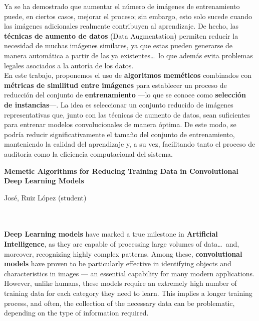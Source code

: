 Ya se ha demostrado que aumentar el número de imágenes de entrenamiento puede, en ciertos casos, mejorar el proceso;
sin embargo, esto solo sucede cuando las imágenes adicionales realmente contribuyen al aprendizaje.
De hecho, las \textbf{técnicas de aumento de datos} (Data Augmentation) permiten reducir la necesidad de muchas
imágenes similares, ya que estas pueden generarse de manera automática a partir de las ya existentes\ldots\ lo que además
evita problemas legales asociados a la autoría de los datos. \\[6pt]

En este trabajo, proponemos el uso de \textbf{algoritmos meméticos} combinados con
\textbf{métricas de similitud entre imágenes} para establecer un proceso de reducción del conjunto de
\textbf{entrenamiento} —lo que se conoce como \textbf{selección de instancias}—.
La idea es seleccionar un conjunto reducido de imágenes representativas que, junto con las técnicas de aumento de
datos, sean suficientes para entrenar modelos convolucionales de manera óptima.
De este modo, se podría reducir significativamente el tamaño del conjunto de entrenamiento, manteniendo la calidad
del aprendizaje y, a su vez, facilitando tanto el proceso de auditoría como la eficiencia computacional del sistema.
\\[6pt]


\cleardoublepage


\thispagestyle{empty}


\begin{center}
       {\large\bfseries Memetic Algorithms for Reducing Training Data in Convolutional Deep Learning Models}\\
\end{center}
\begin{center}
       José, Ruiz López (student)\\
\end{center}

\\

\vspace{0.7cm}
\\

\textbf{Deep Learning models} have marked a true milestone in \textbf{Artificial Intelligence}, as they are capable of
processing large volumes of data\ldots\ and, moreover, recognizing highly complex patterns.
Among these, \textbf{convolutional models} have proven to be particularly effective in identifying objects and
characteristics in images — an essential capability for many modern applications.
However, unlike humans, these models require an extremely high number of training data for each category they need to
learn.
This implies a longer training process, and often, the collection of the necessary data can be problematic, depending
on the type of information required. \\[6pt]

